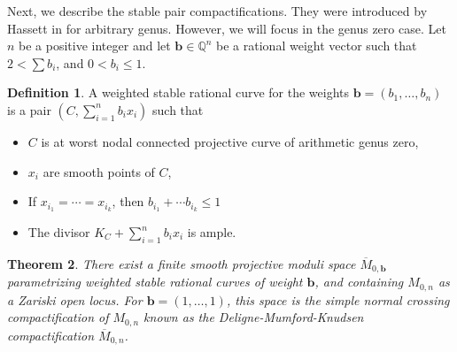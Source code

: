 \documentclass[12pt, letterpaper]{amsart}
\theoremstyle{plain}
\newtheorem{theorem}{Theorem}[section]
\theoremstyle{definition}
\newtheorem{definition}[theorem]{Definition}
\begin{document}
Next, we describe the stable pair compactifications. They were introduced by Hassett in \cite{hassett2003moduli} for arbitrary genus. However, we will focus in the genus zero case.  Let $n$ be a positive integer and let  $\mathbf{b} \in \mathbb{Q}^n$ be a rational weight vector such that $2 < \sum b_i$, and $0 < b_i \leq 1$.
\begin{definition}\cite{hassett2003moduli}
A weighted stable rational curve for the weights $\mathbf{b} = (b_1, \ldots, b_n)$ is a pair
$\left( C, \sum_{i=1}^n b_ix_i \right)$ such that
\begin{itemize}
    \item $C$ is at worst nodal connected projective curve
of arithmetic genus zero,
\item $x_i$ are smooth points of $C$,
    \item If $x_{i_1} = \cdots = x_{i_k}$, then $b_{i_1} + \cdots b_{i_k} \leq 1$
    \item The divisor $K_C + \sum_{i=1}^n b_ix_i$ is ample.
\end{itemize}
\end{definition}
\begin{theorem}\cite[Theorem 2.1]{hassett2003moduli}
There exist a finite smooth projective moduli space 
$\overline{M}_{0,\mathbf{b}}$ parametrizing weighted stable rational curves of weight $\mathbf{b}$, and containing $M_{0,n}$ as a Zariski open locus. For $\mathbf{b} = (1, \ldots, 1)$, this space is the simple normal crossing compactification of $M_{0,n}$
known as the Deligne-Mumford-Knudsen compactification $\overline{M}_{0,n}$.
\end{theorem}
\end{document}
